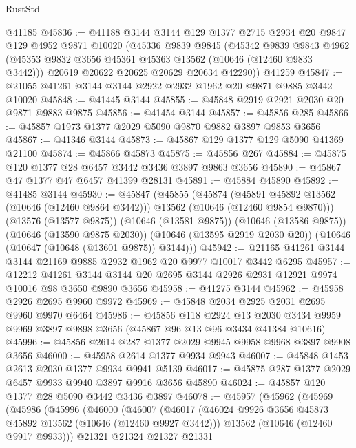 \begin{lexlean}{RustStd}
\begin{coremodule}
    @41185
@45836 := @41188
    @3144
    @3144
    @129
    @1377
    @2715
    @2934
    @20
    @9847
    @129
    @4952
    @9871
    @10020
    (@45336
      @9839
      @9845
      (@45342
        @9839
        @9843
        @4962
        (@45353 @9832 @3656 @45361 @45363 @13562 (@10646 (@12460 @9833 @3442)))
        @20619
        @20622
        @20625
        @20629
        @20634
        @42290))
    @41259
@45847 := @21055 @41261 @3144 @3144 @2922 @2932 @1962 @20 @9871 @9885 @3442 @10020
@45848 := @41445 @3144
@45855 := @45848 @2919 @2921 @2030 @20 @9871 @9883 @9875
@45856 := @41454 @3144
@45857 := @45856 @285
@45866 := @45857 @1973 @1377 @2029 @5090 @9870 @9882 @3897 @9853 @3656
@45867 := @41346 @3144
@45873 := @45867 @129 @1377 @129 @5090 @41369 @21100
@45874 := @45866 @45873
@45875 := @45856 @267
@45884 := @45875 @120 @1377 @28 @6457 @3442 @3436 @3897 @9863 @3656
@45890 := @45867 @47 @1377 @47 @6457 @41399 @28131
@45891 := @45884 @45890
@45892 := @41485 @3144
@45930 := @45847
    (@45855
      (@45874
        (@45891 @45892 @13562 (@10646 (@12460 @9864 @3442)))
        @13562
        (@10646 (@12460 @9854 @9870)))
      (@13576 (@13577 @9875))
      (@10646 (@13581 @9875))
      (@10646 (@13586 @9875))
      (@10646 (@13590 @9875 @2030))
      (@10646 (@13595 @2919 @2030 @20))
      (@10646 (@10647 (@10648 (@13601 @9875)) @3144)))
@45942 := @21165 @41261 @3144 @3144 @21169 @9885 @2932 @1962 @20 @9977 @10017 @3442 @6295
@45957 := @12212
    @41261
    @3144
    @3144
    @20
    @2695
    @3144
    @2926
    @2931
    @12921
    @9974
    @10016
    @98
    @3650
    @9890
    @3656
@45958 := @41275 @3144
@45962 := @45958 @2926 @2695 @9960 @9972
@45969 := @45848 @2034 @2925 @2031 @2695 @9960 @9970 @6464
@45986 := @45856
    @118
    @2924
    @13
    @2030
    @3434
    @9959
    @9969
    @3897
    @9898
    @3656
    (@45867 @96 @13 @96 @3434 @41384 @10616)
@45996 := @45856 @2614 @287 @1377 @2029 @9945 @9958 @9968 @3897 @9908 @3656
@46000 := @45958 @2614 @1377 @9934 @9943
@46007 := @45848 @1453 @2613 @2030 @1377 @9934 @9941 @5139
@46017 := @45875 @287 @1377 @2029 @6457 @9933 @9940 @3897 @9916 @3656 @45890
@46024 := @45857 @120 @1377 @28 @5090 @3442 @3436 @3897
@46078 := @45957
    (@45962
      (@45969
        (@45986
          (@45996
            (@46000
              (@46007
                (@46017
                  (@46024 @9926 @3656 @45873 @45892 @13562 (@10646 (@12460 @9927 @3442)))
                  @13562
                  (@10646 (@12460 @9917 @9933)))
                @21321
                @21324
                @21327
                @21331

\end{coremodule}
\end{lexlean}
